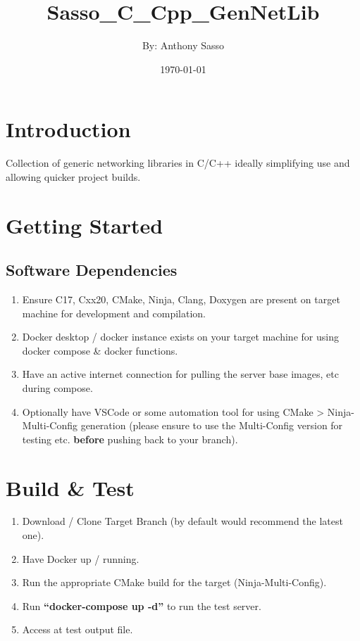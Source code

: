 \documentclass{article}
\title      {\Huge Sasso\_C\_Cpp\_GenNetLib}
\author     {By: Anthony Sasso}
\date       {\today}
\begin{document}
\maketitle

\tableofcontents

\newpage
\section{Introduction}
Collection of generic networking libraries in C/C++ ideally simplifying use and allowing quicker project builds.

\section{Getting Started}
\subsection{Software Dependencies}
\begin{enumerate}
    \item Ensure C17, Cxx20, CMake, Ninja, Clang, Doxygen are present on target machine for development and compilation.
    \item Docker desktop / docker instance exists on your target machine for using docker compose \& docker functions.
    \item Have an active internet connection for pulling the server base images, etc during compose.
    \item Optionally have VSCode or some automation tool for using CMake > Ninja-Multi-Config generation (please ensure to use the Multi-Config version for testing etc. \textbf{before} pushing back to your branch).
\end{enumerate}

\section{Build \& Test}
\begin{enumerate}
    \item Download / Clone Target Branch (by default would recommend the latest one).
    \item Have Docker up / running.
    \item Run the appropriate CMake build for the target (Ninja-Multi-Config).
    \item Run \textbf{``docker-compose up -d''} to run the test server.
    \item Access at test output file.
\end{enumerate}
\end{document}
